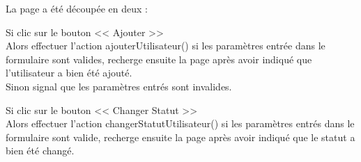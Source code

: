 			\begin{paragraphe}
				La page a été découpée en deux :
			\end{paragraphe}

			\begin{paragraphe}
				Si clic sur le bouton << Ajouter >> \\
				Alors effectuer l'action ajouterUtilisateur() si les paramètres entrée dans le formulaire sont valides, recherge ensuite la page après avoir indiqué que l'utilisateur a bien été ajouté. \\
				Sinon signal que les paramètres entrés sont invalides.
			\end{paragraphe}

			\begin{paragraphe}
				Si clic sur le bouton << Changer Statut >> \\
				Alors effectuer l'action changerStatutUtilisateur() si les paramètres entrés dans le formulaire sont valide, recherge ensuite la page après avoir indiqué que le statut a bien été changé.
			\end{paragraphe}

